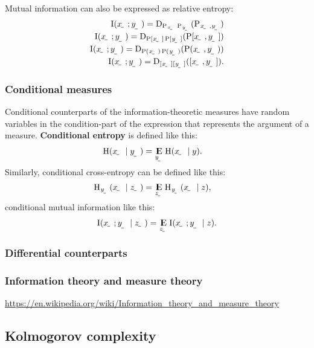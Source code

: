 \documentclass[oneside]{book}
\begin{document}
Mutual information can also be expressed as relative entropy:
\begin{align}
    \I(\rvar x; \rvar y) = \Dist_{\P_{\rvar x}\P_\rvar{y}}(\P_{\rvar x,\rvar y}) \\
    \I(\rvar x; \rvar y) = \Dist_{\P[\rvar x]\P[\rvar y]}(\P[\rvar x,\rvar y]) \\
    \I(\rvar x; \rvar y) = \Dist_{\P(\rvar x)\P(\rvar y)}(\P(\rvar x,\rvar y)) \\
    \I(\rvar x; \rvar y) = \Dist_{[\rvar x][\rvar y]}([\rvar x,\rvar y]) \text.
\end{align}

\subsubsection{Conditional measures}

Conditional counterparts of the information-theoretic measures have random variables in the condition-part of the expression that represents the argument of a measure. \textbf{Conditional entropy} is defined like this:
\begin{align}
    \H(\rvar x\mid\rvar y) &= \E_{\rvar y}\H(\rvar x\mid y) \text.
\end{align}
Similarly, conditional cross-entropy can be defined like this:
\begin{align}
    \H_\rvar{y}(\rvar x\mid\rvar z) &= \E_\rvar{z}\H_\rvar{y}(\rvar x\mid z) \text,
\end{align}
conditional mutual information like this:
\begin{align}
    \I(\rvar x; \rvar y\mid \rvar z) = \E_\rvar{z}\I\del{\rvar x; \rvar y \mid z} \text.
\end{align}

\subsubsection{Differential counterparts}

\subsubsection{Information theory and measure theory}

\url{https://en.wikipedia.org/wiki/Information_theory_and_measure_theory}

\subsection{Kolmogorov complexity}
\end{document}
